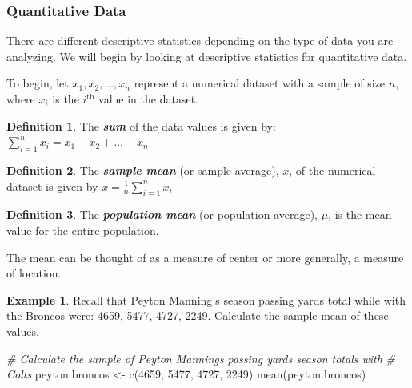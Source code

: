 \documentclass[
  11pt,
]{book}
\newenvironment{Shaded}{\begin{snugshade}}{\end{snugshade}}
\newcommand{\CommentTok}[1]{\textcolor[rgb]{0.56,0.35,0.01}{\textit{#1}}}
\newcommand{\DecValTok}[1]{\textcolor[rgb]{0.00,0.00,0.81}{#1}}
\newcommand{\FunctionTok}[1]{\textcolor[rgb]{0.00,0.00,0.00}{#1}}
\newcommand{\NormalTok}[1]{#1}
\newcommand{\OtherTok}[1]{\textcolor[rgb]{0.56,0.35,0.01}{#1}}
\theoremstyle{definition}
\newtheorem{definition}{Definition}[chapter]
\theoremstyle{definition}
\newtheorem{example}{Example}[chapter]
\theoremstyle{definition}
\theoremstyle{definition}
\theoremstyle{remark}
\begin{document}
\hypertarget{quantitative-data}{%
\subsubsection{Quantitative Data}\label{quantitative-data}}

There are different descriptive statistics depending on the type of data you are analyzing. We will begin by looking at descriptive statistics for quantitative data.

To begin, let \(x_1, x_2, \ldots, x_n\) represent a numerical dataset with a sample of size \(n\), where \(x_i\) is the \(i^\text{th}\) value in the dataset.

\begin{definition}
The \textbf{\emph{sum}} of the data values is given by: \(\sum_{i=1}^n x_i = x_1 + x_2 + \ldots + x_n\)
\end{definition}

\begin{definition}
The \textbf{\emph{sample mean}} (or sample average), \(\bar{x}\), of the numerical dataset is given by \(\bar{x} = \frac{1}{n} \sum_{i=1}^n x_i\)
\end{definition}

\begin{definition}
The \textbf{\emph{population mean}} (or population average), \(\mu\), is the mean value for the entire population.
\end{definition}

The mean can be thought of as a measure of center or more generally, a measure of location.

\begin{example}
Recall that Peyton Manning's season passing yards total while with the Broncos were: 4659, 5477, 4727, 2249. Calculate the sample mean of these values.
\end{example}

\hfill\break
\hfill\break
\hfill\break
\hfill\break
\hfill\break

\begin{Shaded}
\begin{Highlighting}[]
\CommentTok{\# Calculate the sample of Peyton Manning\textquotesingle{}s passing yards season totals with}
\CommentTok{\# Colts}
\NormalTok{peyton.broncos }\OtherTok{\textless{}{-}} \FunctionTok{c}\NormalTok{(}\DecValTok{4659}\NormalTok{, }\DecValTok{5477}\NormalTok{, }\DecValTok{4727}\NormalTok{, }\DecValTok{2249}\NormalTok{)}
\FunctionTok{mean}\NormalTok{(peyton.broncos)}
\end{Highlighting}
\end{Shaded}
\end{document}

